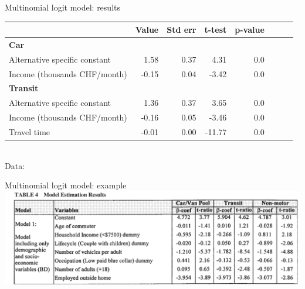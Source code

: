 \begin{frame}{Multinomial logit model: results}
  \centering\begin{tabular}{lrrrrrrr}
\toprule
{} &  Value &  Std err &  t-test &  p-value  \\
\midrule
  \textbf{Car} \\
  \hspace*{1em} Alternative specific constant &   1.58 &     0.37 &    4.31 &      0.0  \\
  \hspace*{1em} Income (thousands CHF/month)   &  -0.15 &     0.04 &   -3.42 &      0.0  \\
  \textbf{Transit} \\
  \hspace*{1em} Alternative specific constant      &   1.36 &     0.37 &    3.65 &      0.0 \\
  \hspace*{1em} Income (thousands CHF/month)      &  -0.16 &     0.05 &   -3.46 &      0.0 \\
  Travel time &  -0.01 &     0.00 &  -11.77 &      0.0 \\
  \bottomrule
\end{tabular}\\
{\tiny Data: \textcite{bierlaire_mode_2018}}
\end{frame}

\begin{frame}{Multinomial logit model: example}
  \includegraphics[width=\textwidth]{img/kuppam.png}\\
  {\tiny \textcite{kuppam_analysis_1999}}
\end{frame}
